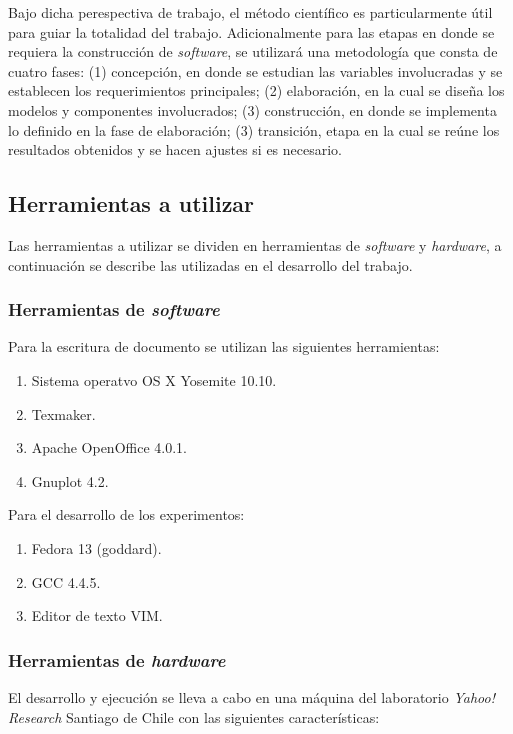 Bajo dicha perespectiva de trabajo, el método científico es particularmente útil para guiar la totalidad del trabajo.
Adicionalmente para las etapas en donde se requiera la construcción de \textit{software}, se utilizará una metodología que consta de cuatro fases: (1) concepción, en donde se estudian las variables involucradas y se establecen los requerimientos principales; (2) elaboración, en la cual se diseña los modelos y componentes involucrados; (3) construcción, en donde se implementa lo definido en la fase de elaboración; (3) transición, etapa en la cual se reúne los resultados obtenidos y se hacen ajustes si es necesario.  

\subsection{Herramientas a utilizar}
\label{intro:herramientas}
Las herramientas a utilizar se dividen en herramientas de \textit{software} y \textit{hardware}, a continuación se describe las utilizadas en el desarrollo del trabajo.

\subsubsection{Herramientas de \textit{software}}
Para la escritura de documento se utilizan las siguientes herramientas: 

\begin{enumerate}
  \item Sistema operatvo OS X Yosemite 10.10.
  \item Texmaker.
  \item Apache OpenOffice 4.0.1.
  \item Gnuplot 4.2.  
\end{enumerate}

Para el desarrollo de los experimentos:

\begin{enumerate}
  \item Fedora 13 (goddard).
  \item GCC 4.4.5.
  \item Editor de texto VIM.
\end{enumerate}

\subsubsection{Herramientas de \textit{hardware}}
El desarrollo y ejecución se lleva a cabo en una máquina del laboratorio \textit{Yahoo!} \textit{Research} Santiago de Chile con las siguientes características: 


